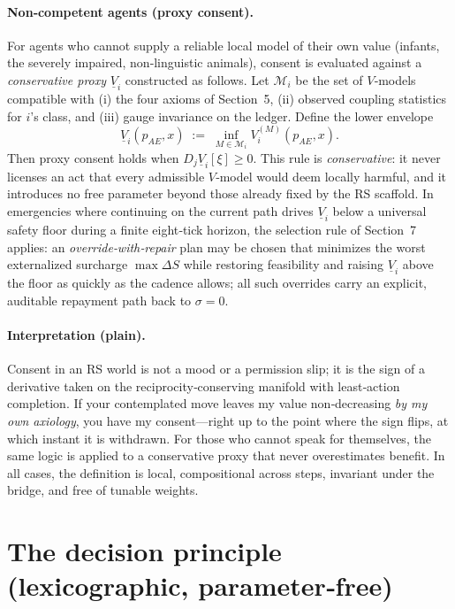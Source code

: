 \documentclass[11pt]{article}
\begin{document}
\paragraph{Non‑competent agents (proxy consent).}
For agents who cannot supply a reliable local model of their own value (infants, the severely impaired, non‑linguistic animals), consent is evaluated against a \emph{conservative proxy} $\underline V_i$ constructed as follows. Let $\mathcal{M}_i$ be the set of $V$‑models compatible with (i) the four axioms of Section~5, (ii) observed coupling statistics for $i$’s class, and (iii) gauge invariance on the ledger. Define the lower envelope
\[
\underline V_i(p_{AE},x)\;:=\;\inf_{M\in\mathcal{M}_i} V_i^{(M)}(p_{AE},x).
\]
Then proxy consent holds when $D_j \underline V_i[\xi]\ge 0$. This rule is \emph{conservative}: it never licenses an act that every admissible $V$‑model would deem locally harmful, and it introduces no free parameter beyond those already fixed by the RS scaffold. In emergencies where continuing on the current path drives $\underline V_i$ below a universal safety floor during a finite eight‑tick horizon, the selection rule of Section~7 applies: an \emph{override‑with‑repair} plan may be chosen that minimizes the worst externalized surcharge $\max\Delta S$ while restoring feasibility and raising $\underline V_i$ above the floor as quickly as the cadence allows; all such overrides carry an explicit, auditable repayment path back to $\sigma\!=\!0$.

\paragraph{Interpretation (plain).}
Consent in an RS world is not a mood or a permission slip; it is the sign of a derivative taken on the reciprocity‑conserving manifold with least‑action completion. If your contemplated move leaves my value non‑decreasing \emph{by my own axiology}, you have my consent—right up to the point where the sign flips, at which instant it is withdrawn. For those who cannot speak for themselves, the same logic is applied to a conservative proxy that never overestimates benefit. In all cases, the definition is local, compositional across steps, invariant under the bridge, and free of tunable weights.

\section{The decision principle (lexicographic, parameter‑free)}
\end{document}
